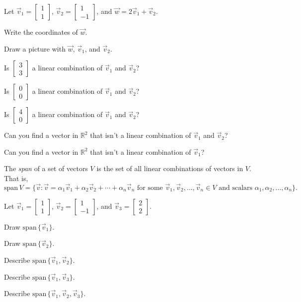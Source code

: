 \documentclass[14pt]{problemset}
\newcommand{\R}{\mathbb{R}}
\newcommand{\Span}{\mathrm{span}\,}
\newcommand{\mat}[1]{\begin{bmatrix}#1\end{bmatrix}}
\begin{document}
	\question
	Let $\vec v_1=\begin{bmatrix}1\\1\end{bmatrix}$, $\vec v_2=\begin{bmatrix}1\\-1\end{bmatrix}$, and $\vec w=2\vec v_1+\vec v_2$.
	\begin{parts}
		\item Write the coordinates of $\vec w$.
		\item Draw a picture with $\vec w$, $\vec v_1$, and $\vec v_2$.
		\item Is $\mat{3\\3}$ a linear combination of $\vec v_1$ and $\vec v_2$?
		\item Is $\mat{0\\0}$ a linear combination of $\vec v_1$ and $\vec v_2$?
		\item Is $\mat{4\\0}$ a linear combination of $\vec v_1$ and $\vec v_2$?
		\item Can you find a vector in $\R^2$ that isn't a linear combination of
		$\vec v_1$ and $\vec v_2$?
		\item Can you find a vector in $\R^2$ that isn't a linear combination of
		$\vec v_1$?
	\end{parts}

	\begin{definition}[Span]
		The \emph{span} of a set of vectors $V$ is the set of
		all linear combinations of vectors in $V$.  That is,
		\[
			\Span V = \{\vec v:\vec v=\alpha_1\vec v_1+\alpha_2\vec v_2 + \cdots 
			+\alpha_n\vec v_n\text{ for some }\vec v_1,\vec v_2,\ldots,\vec v_n\in V
			\text{ and scalars }\alpha_1,\alpha_2,\ldots,\alpha_n\}.
		\]
	\end{definition}

	\vspace{-.3cm}
	\question
	Let $\vec v_1=\mat{1\\1}$, $\vec v_2=\mat{1\\-1}$, and $\vec v_3=\mat{2\\2}$.
	\begin{parts}
		\item Draw $\Span\{\vec v_1\}$.
		\item Draw $\Span\{\vec v_2\}$.
		\item Describe $\Span\{\vec v_1,\vec v_2\}$.
		\item Describe $\Span\{\vec v_1,\vec v_3\}$.
		\item Describe $\Span\{\vec v_1,\vec v_2,\vec v_3\}$.
	\end{parts}
\end{document}
